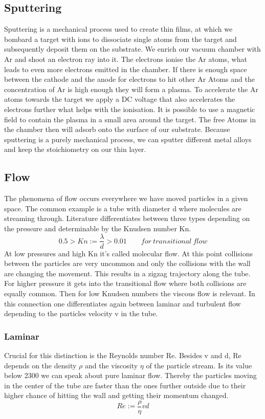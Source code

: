 \documentclass[]{article}
\begin{document}
\subsection{Sputtering}
Sputtering is a mechanical process used to create thin films, at which we bombard a target with ions to dissociate single atoms from the target and subsequently deposit them on the substrate. We enrich our vacuum chamber with Ar and shoot an electron ray into it. The electrons ionise the Ar atoms, what leads to even more electrons emitted in the chamber. If there is enough space between the cathode and the anode for electrons to hit other Ar Atoms and the concentration of Ar is high enough they will form a plasma. To accelerate the Ar atoms towards the target we apply a DC voltage that also accelerates the electrons further what helps with the ionisation. It is possible to use a magnetic field to contain the plasma in a small area around the target. The free Atoms in the chamber then will adsorb onto the surface of our substrate. Because sputtering is a purely mechanical process, we can sputter different metal alloys and keep the stoichiometry on our thin layer.


\subsection{Flow}
The phenomena of flow occurs everywhere we have moved particles in a given space. The common example is a tube with diameter d where molecules are streaming through. Literature differentiates between three types depending on the pressure and determinable by the Knudsen number Kn.
\[ 0.5 > Kn := \frac{\lambda}{d} > 0.01 \qquad for\: transitional\: flow\]
At low pressures and high Kn it's called molecular flow. At this point collisions between the particles are very uncommon and only the collisions with the wall are changing the movement. This results in a zigzag trajectory along the tube. For higher pressure it gets into the transitional flow where both collisions are equally common. Then for low Knudsen numbers the viscous flow is relevant. In this connection one differentiates again between laminar and turbulent flow depending to the particles velocity v in the tube.

\subsubsection{Laminar}
Crucial for this distinction is the Reynolds number Re. Besides v and d, Re depends on the density $\rho$ and the viscosity $\eta$ of the particle stream. Is its value below 2300 we can speak about pure laminar flow. Thereby the particles moving in the center of the tube are faster than the ones further outside due to their higher chance of hitting the wall and getting their momentum changed.
\[ Re:= \frac{\rho}{\eta} v d\]
\end{document}
